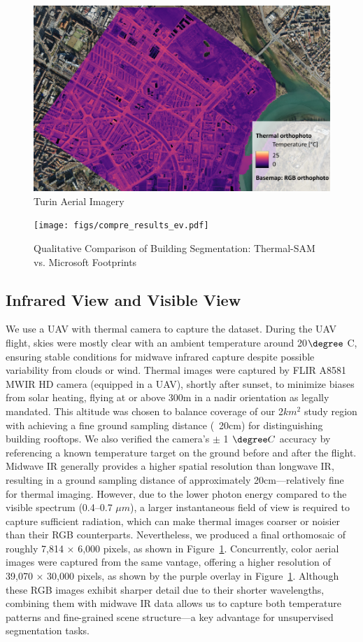 \documentclass{article}
\theoremstyle{plain}
\theoremstyle{definition}
\theoremstyle{remark}
\begin{document}
\begin{figure}[t]
    \centering
    \includegraphics[height=0.6\linewidth]{figs/Thermographic picture_legend.pdf}
    \caption{ Turin Aerial Imagery}
    \label{fig:therm-ortho}
\end{figure}
\begin{figure}[t]
\centering
\texttt{[image: figs/compre\_results\_ev.pdf]}
\caption{Qualitative Comparison of Building Segmentation: Thermal-SAM vs. Microsoft Footprints}
\label{fig:segresultsms}
\end{figure}


\subsection{Infrared View and Visible View}
We use a UAV with thermal camera to capture the dataset. During the UAV flight, skies were mostly clear with an ambient temperature around 20$\degree$ C, ensuring stable conditions for midwave infrared capture despite possible variability from clouds or wind. Thermal images were captured by FLIR A8581 MWIR HD camera (equipped in a UAV), shortly after sunset, to minimize biases from solar heating, flying at or above 300m in a nadir orientation as legally mandated.  This altitude was chosen to balance coverage of our 2$km^2$ study region with achieving a fine ground sampling distance (~20cm) for distinguishing building rooftops. We also verified the camera’s $\pm$ 1 $\degree C$ accuracy by referencing a known temperature target on the ground before and after the flight. Midwave IR generally provides a higher spatial resolution than longwave IR, resulting in a ground sampling distance of approximately 20cm—relatively fine for thermal imaging. However, due to the lower photon energy compared to the visible spectrum (0.4–0.7 $\mu m$), a larger instantaneous field of view is required to capture sufficient radiation, which can make thermal images coarser or noisier than their RGB counterparts. Nevertheless, we produced a final orthomosaic of roughly 7,814 $\times$ 6,000 pixels, as shown in Figure~\ref{fig:therm-ortho}. 
Concurrently, color aerial images were captured from the same vantage, offering a higher resolution of 39,070 × 30,000 pixels, as shown by the purple overlay in Figure~\ref{fig:therm-ortho}. Although these RGB images exhibit sharper detail due to their shorter wavelengths, combining them with midwave IR data allows us to capture both temperature patterns and fine-grained scene structure—a key advantage for unsupervised segmentation tasks.
\end{document}
